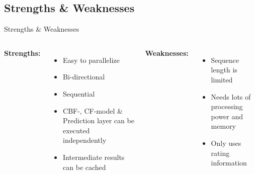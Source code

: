 \documentclass[en]{sdqbeamer}
\begin{document}
\subsection{Strengths \& Weaknesses}
\begin{frame}{Strengths \& Weaknesses}
	\begin{columns}
		\large{\textbf{Strengths:}}
		\begin{itemize}
			\item Easy to parallelize
			\item Bi-directional
			\item Sequential
			\item CBF-, CF-model \& Prediction layer can be executed independently
			\item Intermediate results can be cached
		\end{itemize}
		\large{\textbf{Weaknesses:}}
		\begin{itemize}
			\item Sequence length is limited
			\item Needs lots of processing power and memory
			\item Only uses rating information
		\end{itemize}
	\end{columns}
\end{frame}
\end{document}

